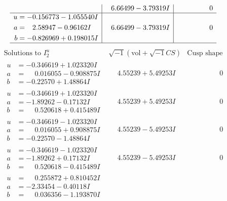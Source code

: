 \documentclass[1p]{elsarticle_modified}
\theoremstyle{definition}
\newcommand{\I}{\sqrt{-1}}
\begin{document}
$$\begin{array}{c|c|c}
 & \phantom{-}6.66499 - 3.79319 I & \phantom{-0.000000 } 0 \\ \hline\begin{aligned}
u &= -0.156773 - 1.055540 I \\
a &= \phantom{-}2.58947 - 0.96162 I \\
b &= -0.826969 + 0.198015 I\end{aligned}
 & \phantom{-}6.66499 - 3.79319 I & \phantom{-0.000000 } 0\\
 \hline 
 \end{array}$$\newpage$$\begin{array}{c|c|c}  
\text{Solutions to }I^u_{2}& \I (\text{vol} + \sqrt{-1}CS) & \text{Cusp shape}\\
 \hline 
\begin{aligned}
u &= -0.346619 + 1.023320 I \\
a &= \phantom{-}0.016055 - 0.908875 I \\
b &= -0.22570 + 1.48864 I\end{aligned}
 & \phantom{-}4.55239 + 5.49253 I & \phantom{-0.000000 } 0 \\ \hline\begin{aligned}
u &= -0.346619 + 1.023320 I \\
a &= -1.89262 - 0.17132 I \\
b &= \phantom{-}0.520618 + 0.415489 I\end{aligned}
 & \phantom{-}4.55239 + 5.49253 I & \phantom{-0.000000 } 0 \\ \hline\begin{aligned}
u &= -0.346619 - 1.023320 I \\
a &= \phantom{-}0.016055 + 0.908875 I \\
b &= -0.22570 - 1.48864 I\end{aligned}
 & \phantom{-}4.55239 - 5.49253 I & \phantom{-0.000000 } 0 \\ \hline\begin{aligned}
u &= -0.346619 - 1.023320 I \\
a &= -1.89262 + 0.17132 I \\
b &= \phantom{-}0.520618 - 0.415489 I\end{aligned}
 & \phantom{-}4.55239 - 5.49253 I & \phantom{-0.000000 } 0 \\ \hline\begin{aligned}
u &= \phantom{-}0.255872 + 0.810452 I \\
a &= -2.33454 - 0.40118 I \\
b &= \phantom{-}0.036356 - 1.193870 I\end{aligned}

\end{array}$$
\end{document}
